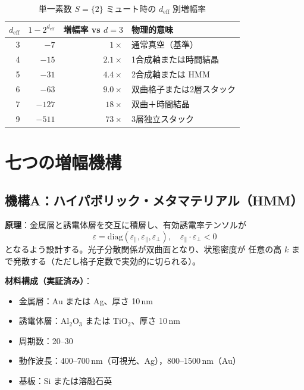 \documentclass[11pt,a4paper]{article}
\newcommand{\deff}{d_{\mathrm{eff}}}
\begin{document}
\begin{table}[h]
\centering
\caption{単一素数 $S=\{2\}$ ミュート時の $\deff$ 別増幅率}
\label{tab:deff_amp}
\begin{tabular}{rrrl}
\toprule
$\deff$ & $1-2^{\deff}$ & 増幅率 vs $d=3$ & 物理的意味 \\
\midrule
3  & $-7$    & $1\times$    & 通常真空（基準） \\
4  & $-15$   & $2.1\times$  & 1合成軸または時間結晶 \\
5  & $-31$   & $4.4\times$  & 2合成軸または HMM \\
6  & $-63$   & $9.0\times$  & 双曲格子または2層スタック \\
7  & $-127$  & $18\times$   & 双曲＋時間結晶 \\
9  & $-511$  & $73\times$   & 3層独立スタック \\
\bottomrule
\end{tabular}
\end{table}

\section{七つの増幅機構}

\subsection{機構A：ハイパボリック・メタマテリアル（HMM）}
\label{sec:hmm}

\textbf{原理}：金属層と誘電体層を交互に積層し、有効誘電率テンソルが
\[
\varepsilon = \mathrm{diag}(\varepsilon_\parallel, \varepsilon_\parallel, \varepsilon_\perp),
\quad \varepsilon_\parallel \cdot \varepsilon_\perp < 0
\]
となるよう設計する。光子分散関係が双曲面となり、状態密度が
任意の高 $k$ まで発散する（ただし格子定数で実効的に切られる）。

\textbf{材料構成（実証済み）}：
\begin{itemize}[leftmargin=2em,nosep]
  \item 金属層：Au または Ag、厚さ 10\,nm
  \item 誘電体層：Al$_2$O$_3$ または TiO$_2$、厚さ 10\,nm
  \item 周期数：20--30
  \item 動作波長：400--700\,nm（可視光、Ag），800--1500\,nm（Au）
  \item 基板：Si または溶融石英
\end{itemize}
\end{document}
